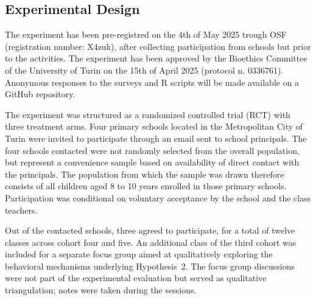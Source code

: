 \documentclass[preprint,12pt]{elsarticle}
\begin{document}
\subsection{Experimental Design}
The experiment has been pre-registred on the 4th of May 2025 trough OSF (registration number: X4zuk), after collecting participation from schools but prior to the activities. The experiment has been approved by the Bioethics Committee of the University of Turin on the 15th of April 2025 (protocol n. 0336761). Anonymous responses to the surveys and R scripts will be made available on a GitHub repository.

The experiment was structured as a randomized controlled trial (RCT) with three treatment arms.
Four primary schools located in the Metropolitan City of Turin were invited to participate through an email sent to school principals. The four schools contacted were not randomly selected from the overall population, but represent a convenience sample based on availability of direct contact with the principals. The population from which the sample was drawn therefore consists of all children aged 8 to 10 years enrolled in those primary schools. Participation was conditional on voluntary acceptance by the school and the class teachers.

Out of the contacted schools, three agreed to participate, for a total of twelve classes across cohort four and five. An additional class of the third cohort was included for a separate focus group aimed at qualitatively exploring the behavioral mechanisms underlying Hypothesis~2. The focus group discussions were not part of the experimental evaluation but served as qualitative triangulation; notes were taken during the sessions.
\end{document}

